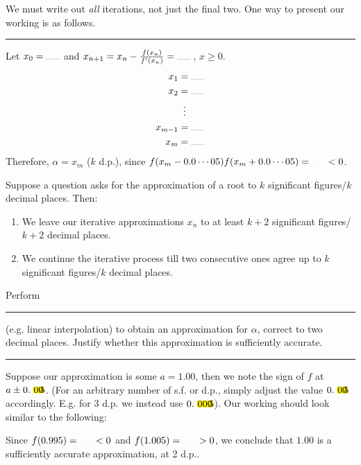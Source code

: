 \documentclass[../Notes.tex]{subfiles}
\begin{document}
\begin{note}
    We must write out \emph{all} iterations, not just the final two. One way to present our working is as follows.

    \rule{20cm-137.0549pt}{0.05mm}

    Let \(x_0=\rule{0.5cm}{0.05mm}\) and \(x_{n+1}=x_n-\frac{f(x_n)}{f'(x_n)}=\rule{0.5cm}{0.05mm}\)\,, \(x\geq 0\).
    \begin{align*}
        x_1&=\rule{0.5cm}{0.05mm}\\
        x_2&=\rule{0.5cm}{0.05mm}\\
        &\vdotswithin{=}\\
        x_{m-1}&=\rule{0.5cm}{0.05mm}\\
        x_m&=\rule{0.5cm}{0.05mm}
    \end{align*}
    Therefore, \(\alpha=x_m\) (\(k\) d.p.), since \(f(x_m-0.0\cdots05)f(x_m+0.0\cdots05)=\rule{0.5cm}{0.01mm}<0\).
\end{note}
\begin{note}
    Suppose a question asks for the approximation of a root to \(k\) significant figures/\(k\) decimal places. Then: 
    \begin{enumerate}
        \item We leave our iterative approximations \(x_n\) to at least \(k+2\) significant figures/\(k+2\) decimal places.
        \item We continue the iterative process till two consecutive ones agree up to \(k\) significant figures/\(k\) decimal places.
    \end{enumerate}
\end{note}
\begin{note}
    Perform \rule{1.5cm}{0.01mm} (e.g. linear interpolation) to obtain an approximation for \(\alpha\), correct to two decimal places. Justify whether this approximation is sufficiently accurate.

    \rule{20cm-137.0549pt}{0.05mm}

    Suppose our approximation is some \(a=1.00\), then we note the sign of \(f\) at \(a\pm 0.\highlight[yellow]{00}5\). (For an arbitrary number of s.f. or d.p., simply adjust the value \(0.\highlight[yellow]{00}5\) accordingly. E.g. for 3 d.p. we instead use \(0.\highlight[yellow]{000}5\)). Our working should look similar to the following:
    \begin{center}
        \parbox{0.9\textwidth}{
            Since \(f(0.995)=\rule{0.5cm}{0.01mm}<0\) and \(f(1.005)=\rule{0.5cm}{0.01mm}>0\), we conclude that \(1.00\) is a sufficiently accurate approximation, at 2 d.p..
        }
    \end{center}
\end{note}
\end{document}
